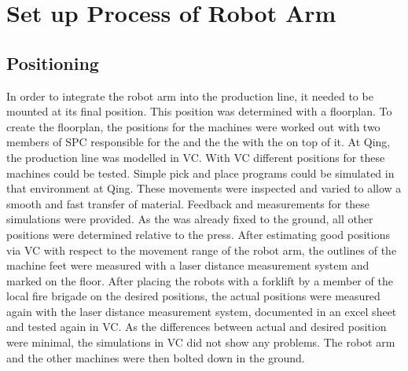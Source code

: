 \section{Set up Process of Robot Arm}

\subsection{Positioning}
In order to integrate the robot arm into the production line, it needed to be mounted at its final position. This position was determined with a floorplan. To create the floorplan, the positions for the machines were worked out with two members of \ac{SPC} responsible for the  and the the  with the  on top of it.
At Qing, the production line was modelled in \ac{VC}. With \ac{VC} different positions for these machines could be tested. 
Simple pick and place programs could be simulated in that environment at Qing.
These movements were inspected and varied to allow a smooth and fast transfer of material. Feedback and measurements for these simulations were provided.
As the  was already fixed to the ground, all other positions were determined relative to the press.
After estimating good positions via \ac{VC} with respect to the movement range of the robot arm, the outlines of the machine feet were measured with a laser distance measurement system and marked on the floor.
After placing the robots with a forklift by a member of the local fire brigade on the desired positions, the actual positions were measured again with the laser distance measurement system, documented in an excel sheet and tested again in VC. 
As the differences between actual and desired position were minimal, the simulations in VC did not show any problems.
The robot arm and the other machines were then bolted down in the ground. \\


